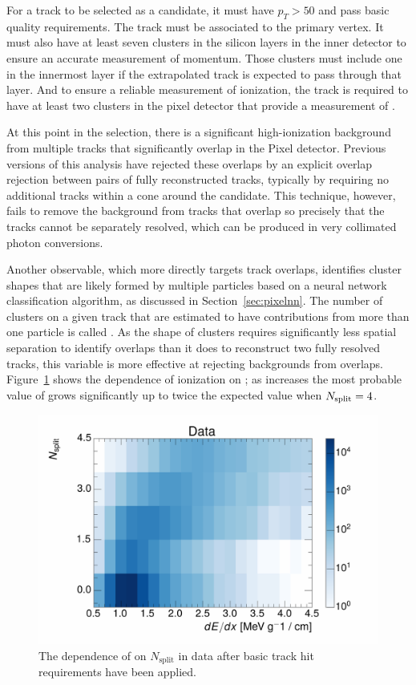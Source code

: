 For a track to be selected as a candidate, it must have $p_T > 50$ \GeV and pass basic quality requirements. 
The track must be associated to the primary vertex.
It must also have at least seven clusters in the silicon layers in the inner detector to ensure an accurate measurement of momentum.
Those clusters must include one in the innermost layer if the extrapolated track is expected to pass through that layer.
And to ensure a reliable measurement of ionization, the track is required to have at least two clusters in the pixel detector that provide a measurement of \dedx.

At this point in the selection, there is a significant high-ionization background from multiple tracks that significantly overlap in the Pixel detector. 
Previous versions of this analysis have rejected these overlaps by an explicit overlap rejection between pairs of fully reconstructed tracks, typically by requiring no additional tracks within a cone around the candidate. 
This technique, however, fails to remove the background from tracks that overlap so precisely that the tracks cannot be separately resolved, which can be produced in very collimated photon conversions.

Another observable, which more directly targets track overlaps, identifies cluster shapes that are likely formed by multiple particles based on a neural network classification algorithm, as discussed in Section~\ref{sec:pixelnn}.
The number of clusters on a given track that are estimated to have contributions from more than one particle is called \Nsplit.
As the shape of clusters requires significantly less spatial separation to identify overlaps than it does to reconstruct two fully resolved tracks, this variable is more effective at rejecting backgrounds from overlaps.
Figure~\ref{fig:dedx_nsplit} shows the dependence of ionization on \Nsplit; as \Nsplit increases the most probable value of \dedx grows significantly up to twice the expected value when $N_{\mathrm{split}} = 4$. 

\begin{figure}[h]
\centering
\includegraphics[width=\fullfig]{figures/dedx_nsplit_data.pdf}
\caption{The dependence of \dedx on $N_{\mathrm{split}}$ in data after basic track hit requirements have been applied.}
\label{fig:dedx_nsplit}
\end{figure}

